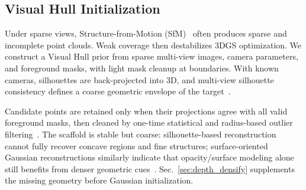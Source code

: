 \subsection{Visual Hull Initialization}
\label{sec:visual_hull}

Under sparse views, Structure-from-Motion (SfM)~\cite{Schonberger16_COLMAP} often produces sparse and incomplete point clouds. Weak coverage then destabilizes 3DGS optimization. We construct a Visual Hull prior from sparse multi-view images, camera parameters, and foreground masks, with light mask cleanup at boundaries. With known cameras, silhouettes are back-projected into 3D, and multi-view silhouette consistency defines a coarse geometric envelope of the target~\cite{Laurentini94_VisualHull}.

Candidate points are retained only when their projections agree with all valid foreground masks, then cleaned by one-time statistical and radius-based outlier filtering~\cite{Balta18_SOR}. The scaffold is stable but coarse: silhouette-based reconstruction cannot fully recover concave regions and fine structures; surface-oriented Gaussian reconstructions similarly indicate that opacity/surface modeling alone still benefits from denser geometric cues~\cite{Guedon24_SuGaR,Yu24_GOF}. Sec.~\ref{sec:depth_densify} supplements the missing geometry before Gaussian initialization.
